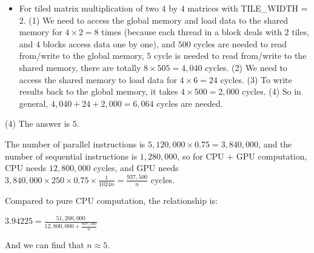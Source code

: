 \documentclass[11pt]{article}
\begin{document}
\begin{solution}
\begin{itemize}
\item For tiled matrix multiplication of two $4$ by $4$ matrices with TILE\_WIDTH = $2$. (1) We need to access the global memory and load data to the shared memory for $4 \times 2 = 8$ times (because each thread in a block deals with $2$ tiles, and $4$ blocks access data one by one), and $500$ cycles are needed to read from/write to the global memory, $5$ cycle is needed to read from/write to the shared memory, there are totally $8 \times 505 = 4,040$ cycles. (2) We need to access the shared memory to load data for $4 \times 6 = 24$ cycles. (3) To write results back to the global memory, it takes $4 \times 500 = 2,000$ cycles. (4) So in general, $4,040 + 24 + 2,000 = 6,064$ cycles are needed.
\end{itemize}
\item (4) The answer is $5$.
\item The number of parallel instructions is $5,120,000 \times 0.75 = 3,840,000$, and the number of sequential instructions is $1,280,000$, so for CPU + GPU computation, CPU needs $12,800,000$ cycles, and GPU needs $3,840,000 \times 250 \times 0.75 \times \frac{1}{1024n} = \frac{937,500}{n}$ cycles.
\item Compared to pure CPU computation, the relationship is:
\item $3.94225 = \frac{51,200,000}{12,800,000 + \frac{937,500}{n}}$
\item And we can find that $n \approx 5$.
\end{solution}
\setcounter{page}{10}
\end{document}
